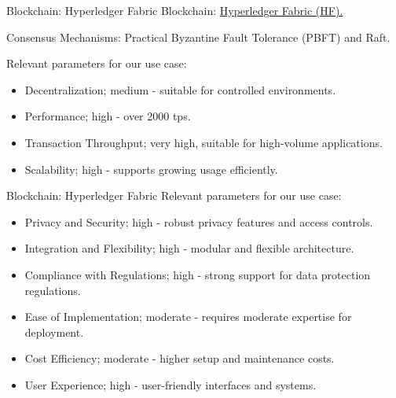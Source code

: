 \documentclass{beamer}
\begin{document}
\begin{frame}{Blockchain: Hyperledger Fabric}
\alert{Blockchain}: \href{https://www.hyperledger.org/projects/fabric}{Hyperledger Fabric (HF).} \newline

\alert{Consensus Mechanisms}: Practical Byzantine Fault Tolerance (PBFT) and Raft. \newline

Relevant parameters for our use case:
\begin{itemize}
	\item Decentralization; medium - suitable for controlled environments.
	\item Performance; high - over 2000 tps.
	\item Transaction Throughput; very high, suitable for high-volume applications.
	\item Scalability; high - supports growing usage efficiently.
	\end{itemize}
\end{frame}



\begin{frame}{Blockchain: Hyperledger Fabric}
Relevant parameters for our use case:
\begin{itemize}
	\item Privacy and Security; high - robust privacy features and access controls.
	\item Integration and Flexibility; high - modular and flexible architecture.
	\item Compliance with Regulations; high - strong support for data protection regulations.
	\item Ease of Implementation;  moderate - requires moderate expertise for deployment.
	\item Cost Efficiency; moderate - higher setup and maintenance costs.
	\item User Experience; high - user-friendly interfaces and systems.
\end{itemize}
\end{frame}
\end{document}
